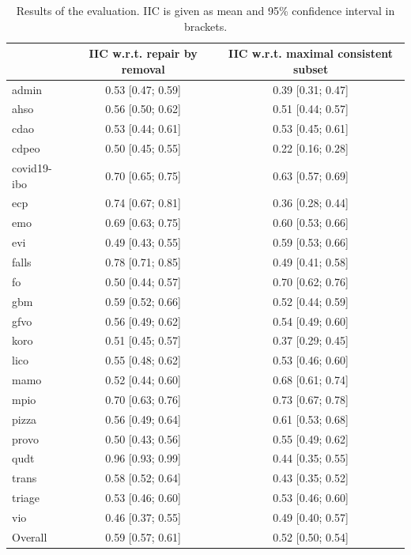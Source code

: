 \begin{table}[ht]
  \scriptsize
  \centering
  \begin{tabular}{|l|cc|}
    \cline{2-3}
    \multicolumn{1}{l|}{} & IIC w.r.t. repair by removal & IIC w.r.t. maximal consistent subset \\
    \hline
    admin & 0.53 [0.47; 0.59] & 0.39 [0.31; 0.47] \\
    ahso & 0.56 [0.50; 0.62] & 0.51 [0.44; 0.57] \\
    cdao & 0.53 [0.44; 0.61] & 0.53 [0.45; 0.61] \\
    cdpeo & 0.50 [0.45; 0.55] & 0.22 [0.16; 0.28] \\
    covid19-ibo & 0.70 [0.65; 0.75] & 0.63 [0.57; 0.69] \\
    ecp & 0.74 [0.67; 0.81] & 0.36 [0.28; 0.44] \\
    emo & 0.69 [0.63; 0.75] & 0.60 [0.53; 0.66] \\
    evi & 0.49 [0.43; 0.55] & 0.59 [0.53; 0.66] \\
    falls & 0.78 [0.71; 0.85] & 0.49 [0.41; 0.58] \\
    fo & 0.50 [0.44; 0.57] & 0.70 [0.62; 0.76] \\
    gbm & 0.59 [0.52; 0.66] & 0.52 [0.44; 0.59] \\
    gfvo & 0.56 [0.49; 0.62] & 0.54 [0.49; 0.60] \\
    koro & 0.51 [0.45; 0.57] & 0.37 [0.29; 0.45] \\
    lico & 0.55 [0.48; 0.62] & 0.53 [0.46; 0.60] \\
    mamo & 0.52 [0.44; 0.60] & 0.68 [0.61; 0.74] \\
    mpio & 0.70 [0.63; 0.76] & 0.73 [0.67; 0.78] \\
    pizza & 0.56 [0.49; 0.64] & 0.61 [0.53; 0.68] \\
    provo & 0.50 [0.43; 0.56] & 0.55 [0.49; 0.62] \\
    qudt & 0.96 [0.93; 0.99] & 0.44 [0.35; 0.55] \\
    trans & 0.58 [0.52; 0.64] & 0.43 [0.35; 0.52] \\
    triage & 0.53 [0.46; 0.60] & 0.53 [0.46; 0.60] \\
    vio & 0.46 [0.37; 0.55] & 0.49 [0.40; 0.57] \\
    \hline
    Overall & 0.59 [0.57; 0.61] & 0.52 [0.50; 0.54] \\
    \hline
  \end{tabular}
  \caption{Results of the evaluation. IIC is given as mean and 95\% confidence interval in brackets.}
  \label{table:results}
\end{table}

